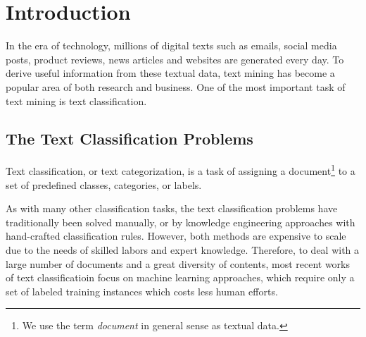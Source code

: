 \chapter{Introduction}
\par In the era of technology, millions of digital texts such as emails, social media posts, product reviews, news articles and websites are generated every day. To derive useful information from these textual data, text mining has become a popular area of both research and business. One of the most important task of text mining is text classification.

\section{The Text Classification Problems}
\par Text classification, or text categorization, is a task of assigning a document\footnote{We use the term \textit{document} in general sense as textual data.} to a set of predefined classes, categories, or labels.
\par As with many other classification tasks, the text classification problems have traditionally been solved manually, or by knowledge engineering approaches with hand-crafted classification rules. However, both methods are expensive to scale due to the needs of skilled labors and expert knowledge. Therefore, to deal with a large number of documents and a great diversity of contents, most recent works of text classificatioin focus on machine learning approaches, which require only a set of labeled training instances which costs less human efforts\cite{feldman2007tm,manning2008ir}.

